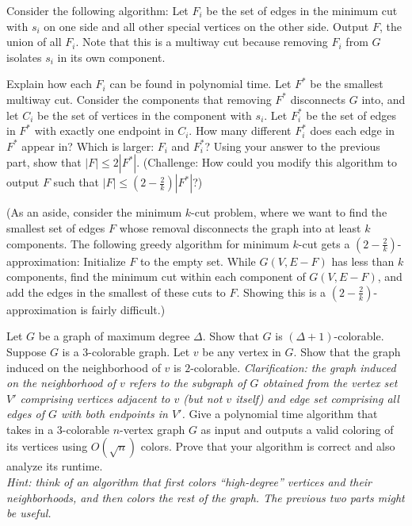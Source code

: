\documentclass{article}
\begin{document}
Consider the following algorithm: Let $F_i$ be the set of edges in the minimum cut with $s_i$ on one side and all other special vertices on the other side. Output $F$, the union of all $F_i$. Note that this is a multiway cut because removing $F_i$ from $G$ isolates $s_i$ in its own component.

\begin{subparts}
\subpart Explain how each $F_i$ can be found in polynomial time.
\subpart Let $F^*$ be the smallest multiway cut. Consider the components that removing $F^*$ disconnects $G$ into, and let $C_i$ be the set of vertices in the component with $s_i$. Let $F_i^*$ be the set of edges in $F^*$ with exactly one endpoint in $C_i$. How many different $F_i^*$ does each edge in $F^*$ appear in? Which is larger: $F_i$ and $F_i^*$? 
\subpart Using your answer to the previous part, show that $|F| \leq 2|F^*|$. (Challenge: How could you modify this algorithm to output $F$ such that $|F| \leq (2-\frac{2}{k})|F^*|$?) 
\end{subparts}

(As an aside, consider the minimum $k$-cut problem, where we want to find the smallest set of edges $F$ whose removal disconnects the graph into at least $k$ components. The following greedy algorithm for minimum $k$-cut gets a $(2 - \frac{2}{k})$-approximation: Initialize $F$ to the empty set. While $G(V, E - F)$ has less than $k$ components, find the minimum cut within each component of $G(V, E-F)$, and add the edges in the smallest of these cuts to $F$. Showing this is a $(2-\frac{2}{k})$-approximation is fairly difficult.)

\begin{subparts}
    \subpart \label{part:max-deg-color} Let $G$ be a graph of maximum degree $\Delta$.  Show that $G$ is $(\Delta+1)$-colorable.
    \subpart \label{part:bipartite-neighborhood} Suppose $G$ is a $3$-colorable graph.  Let $v$ be any vertex in $G$.  Show that the graph induced on the neighborhood of $v$ is $2$-colorable.  \emph{Clarification: the graph induced on the neighborhood of $v$ refers to the subgraph of $G$ obtained from the vertex set $V'$ comprising vertices adjacent to $v$ (but not $v$ itself) and edge set comprising all edges of $G$ with both endpoints in $V'$.}
    \subpart \label{part:sqrtn-colors} Give a polynomial time algorithm that takes in a $3$-colorable $n$-vertex graph $G$ as input and outputs a valid coloring of its vertices using $O(\sqrt{n})$ colors.  Prove that your algorithm is correct and also analyze its runtime.\\
    \emph{Hint: think of an algorithm that first colors ``high-degree'' vertices and their neighborhoods, and then colors the rest of the graph.  The previous two parts might be useful.}
\end{subparts}
\end{document}
